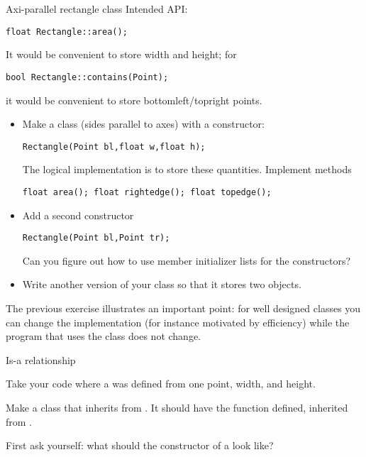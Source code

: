 \begin{block}{Axi-parallel rectangle class}
  \label{ex:geom:rect}
  Intended API:
\begin{verbatim}
float Rectangle::area();
\end{verbatim}
It would be convenient to store width and height; for 
\begin{verbatim}
bool Rectangle::contains(Point);  
\end{verbatim}
it would be convenient to store bottomleft/topright points.
\end{block}

\begin{exercise}
  \label{ex:geom:rect2}
  \begin{itemize}
  \item
    Make a class  (sides parallel to axes) with a constructor:
\begin{verbatim}
Rectangle(Point bl,float w,float h);
\end{verbatim}
The logical implementation is to store these quantities.
Implement methods
\begin{verbatim}
float area(); float rightedge(); float topedge();
\end{verbatim}
\item Add a second constructor
\begin{verbatim}
Rectangle(Point bl,Point tr);
\end{verbatim}
Can you figure out how to use member initializer lists for the constructors?
\item Write another version of your class so that it stores two  objects.
\end{itemize}
\end{exercise}

The previous exercise illustrates an important point: for well
designed classes you can change the implementation (for instance motivated
by efficiency) while the program that uses the class does not change.

 {Is-a relationship}
\label{sec:geom-isa}

\prerequisite{\ref{sec:inheritance}}

\begin{exercise}
  \label{ex:geom:square}
  Take your code where a  was defined from one point,
  width, and height.

  Make a class  that inherits from . It should
  have the function  defined, inherited from .

  First ask yourself: what should the constructor of a  look like?
\end{exercise}

